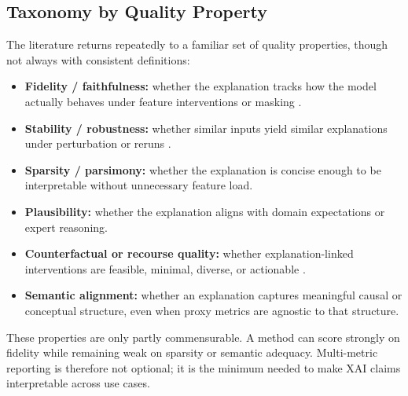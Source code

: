 \documentclass[twoside,11pt]{article}
\begin{document}
\subsection{Taxonomy by Quality Property}

The literature returns repeatedly to a familiar set of quality properties,
though not always with consistent definitions:
\begin{itemize}[leftmargin=*]
\item \textbf{Fidelity / faithfulness:} whether the explanation tracks
how the model actually behaves under feature interventions or masking
\citep{ribeiro2016why,lundberg2017unified,zheng2025ffidelity}.
\item \textbf{Stability / robustness:} whether similar inputs yield
similar explanations under perturbation or reruns
\citep{pawlicki2024metrics,canha2025benchmark}.
\item \textbf{Sparsity / parsimony:} whether the explanation is concise
enough to be interpretable without unnecessary feature load.
\item \textbf{Plausibility:} whether the explanation aligns with domain
expectations or expert reasoning.
\item \textbf{Counterfactual or recourse quality:} whether
explanation-linked interventions are feasible, minimal, diverse, or
actionable \citep{mothilal2020dice}.
\item \textbf{Semantic alignment:} whether an explanation captures
meaningful causal or conceptual structure, even when proxy metrics are
agnostic to that structure.
\end{itemize}

These properties are only partly commensurable. A method can score
strongly on fidelity while remaining weak on sparsity or semantic
adequacy. Multi-metric reporting is therefore not optional; it is the
minimum needed to make XAI claims interpretable across use cases.
\end{document}
